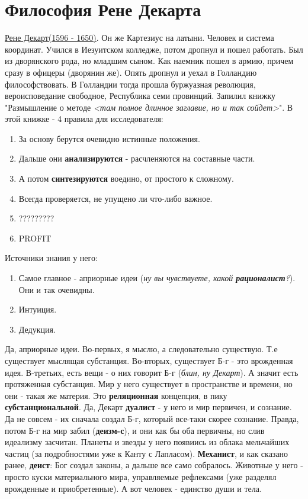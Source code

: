 \section{Философия Рене Декарта}
\underline{Рене Декарт(1596 - 1650)}. Он же Картезиус на латыни. Человек и система координат. Учился в Иезуитском колледже, потом дропнул и пошел работать. Был из дворянского рода, но младшим сыном. Как наемник пошел в армию, причем сразу в офицеры (дворянин же). Опять дропнул и уехал в Голландию философствовать. В Голландии тогда прошла буржуазная революция, вероисповедание свободное, Республика семи провинций. Запилил книжку "Размышление о методе \textit{<там полное длинное заглавие, но и так сойдет>}". В этой книжке - 4 правила для исследователя:
\begin{enumerate}
\item За основу берутся очевидно истинные положения.
\item Дальше они \textbf{анализируются} - расчленяются на составные части.
\item А потом \textbf{синтезируются} воедино, от простого к сложному.
\item Всегда проверяется, не упущено ли что-либо важное.
\item ?????????
\item PROFIT
\end{enumerate}
Источники знания у него:
\begin{enumerate}
\item Самое главное - априорные идеи (\textit{ну вы чувствуете, какой \textbf{рационалист}?}). Они и так очевидны.
\item Интуиция.
\item Дедукция.
\end{enumerate}
Да, априорные идеи. Во-первых, я мыслю, а следовательно существую. Т.е существует мыслящая субстанция.
Во-вторых, существует Б-г - это врожденная идея. В-третьих, есть вещи - о них говорит Б-г (\textit{блин, ну Декарт}). А значит есть протяженная субстанция. Мир у него существует в пространстве и времени, но они - такая же материя. Это \textbf{реляционная} концепция, в пику \textbf{субстанциональной}. Да, Декарт \textbf{дуалист} - у него и мир первичен, и сознание. Да не совсем - их сначала создал Б-г, который все-таки скорее сознание. Правда, потом Б-г на мир забил (\textbf{деизм-с}), и они как бы оба первичны, но слив идеализму засчитан. Планеты и звезды у него появиись из облака мельчайших частиц (за подробностями уже к Канту с Лапласом). \textbf{Механист}, и как сказано ранее, \textbf{деист}: Бог создал законы, а дальше все само собралось. Животные у него - просто куски материального мира, управляемые рефлексами (уже разделял врожденные и приобретенные). А вот человек - единство души и тела.

